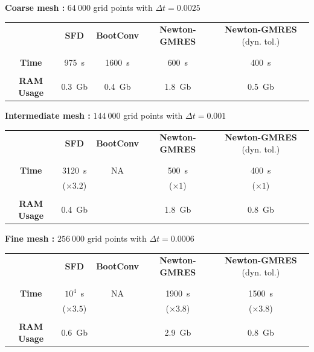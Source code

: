 \documentclass[aspectratio=169, usenames, dvipsnames]{beamer}
\begin{document}
{\begin{frame}
  \vfill
  \centering
  \textbf{Coarse mesh :} $64\ 000$ grid points with $\Delta t = 0.0025$

  \vfill
  
  \begin{tabular}{ccccc}
    ~ & \textbf{SFD} & \textbf{BootConv} & \textbf{Newton-GMRES} & \textbf{Newton-GMRES} (dyn. tol.) \\
    \\
    \hline \\
    \textbf{Time} & 975~\unit{\s} & 1600~\unit{\s} & 600~\unit{\s} & 400~\unit{\s}\\
    \\
    \textbf{RAM Usage} & 0.3~\unit{Gb} & 0.4~\unit{Gb} & 1.8~\unit{Gb} & 0.5~\unit{Gb} 
  \end{tabular}
  \vfill
\end{frame}


\begin{frame}
  \vfill
  \centering
  \textbf{Intermediate mesh :} $144\ 000$ grid points with $\Delta t = 0.001$

  \vfill
  
  \begin{tabular}{ccccc}
    ~ & \textbf{SFD} & \textbf{BootConv} & \textbf{Newton-GMRES} & \textbf{Newton-GMRES} (dyn. tol.) \\
    \\
    \hline \\
    \textbf{Time} & 3120~\unit{\s} & NA & 500~\unit{\s} & 400~\unit{\s}\\
      & ($\times 3.2$) &  & ($\times 1$) & ($\times 1$) \\
    \\
    \textbf{RAM Usage} & 0.4~\unit{Gb} &  & 1.8~\unit{Gb} & 0.8~\unit{Gb} 
  \end{tabular}
  \vfill
\end{frame}


\begin{frame}
  \vfill
  \centering
  \textbf{Fine mesh :} $256\ 000$ grid points with $\Delta t = 0.0006$

  \vfill
  
  \begin{tabular}{ccccc}
    ~ & \textbf{SFD} & \textbf{BootConv} & \textbf{Newton-GMRES} & \textbf{Newton-GMRES} (dyn. tol.) \\
    \\
    \hline \\
    \textbf{Time} & $10^4$~\unit{\s} & NA & 1900~\unit{\s} & 1500~\unit{\s}\\
      & ($\times 3.5$) &  & ($\times 3.8$) & ($\times 3.8$) \\
    \\
    \textbf{RAM Usage} & 0.6~\unit{Gb} &  & 2.9~\unit{Gb} & 0.8~\unit{Gb} 
  \end{tabular}
  \vfill
\end{frame}


}
\end{document}
